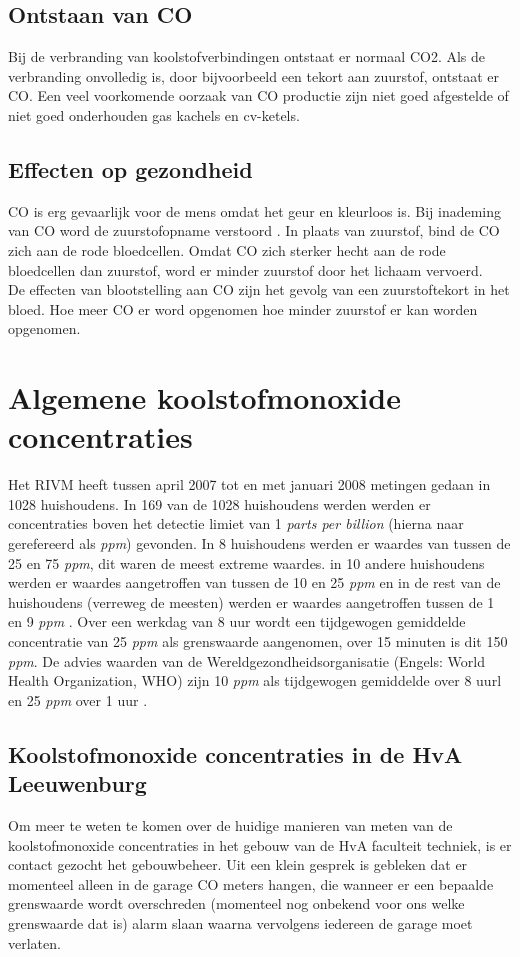 \documentclass[a4paper, 11pt]{article} %
\begin{document}
\subsection{Ontstaan van CO}
Bij de verbranding van koolstofverbindingen ontstaat er normaal CO2. Als de verbranding onvolledig is, door bijvoorbeeld een tekort aan zuurstof, ontstaat er CO. Een veel voorkomende oorzaak van CO productie zijn niet goed afgestelde of niet goed onderhouden gas kachels en cv-ketels.

\subsection{Effecten op gezondheid}
CO is erg gevaarlijk voor de mens omdat het geur en kleurloos is. Bij inademing van CO word de zuurstofopname verstoord \cite{Effecten Koolmonoxide}. In plaats van zuurstof, bind de CO zich aan de rode bloedcellen. Omdat CO zich sterker hecht aan de rode bloedcellen dan zuurstof, word er minder zuurstof door het lichaam vervoerd. 
\\
De effecten van blootstelling aan CO zijn het gevolg van een zuurstoftekort in het bloed. Hoe meer CO er word opgenomen hoe minder zuurstof er kan worden opgenomen. 

\section{Algemene koolstofmonoxide concentraties}
Het RIVM heeft tussen april 2007 tot en met januari 2008 metingen gedaan in 1028 huishoudens. In 169 van de 1028 huishoudens werden werden er concentraties boven het detectie limiet van 1 \textit{parts per billion} (hierna naar gerefereerd als \textit{ppm}) gevonden. In 8 huishoudens werden er waardes van tussen de 25 en 75 \textit{ppm}, dit waren de meest extreme waardes. in 10 andere huishoudens werden er waardes aangetroffen van tussen de 10 en 25 \textit{ppm} en in de rest van de huishoudens (verreweg de meesten) werden er waardes aangetroffen tussen de 1 en 9 \textit{ppm} \cite{RIVM huurwoningen}. Over een werkdag van 8 uur wordt een tijdgewogen gemiddelde concentratie van 25 \textit{ppm} als grenswaarde aangenomen, over 15 minuten is dit 150 \textit{ppm}. De advies waarden van de Wereldgezondheidsorganisatie (Engels: World Health Organization, WHO) zijn 10 \textit{ppm} als tijdgewogen gemiddelde over 8 uurl en 25 \textit{ppm} over 1 uur \cite{Blootstelling aan CO}.
\subsection{Koolstofmonoxide concentraties in de HvA Leeuwenburg}
Om meer te weten te komen over de huidige manieren van meten van de koolstofmonoxide concentraties in het gebouw van de HvA faculteit techniek, is er contact gezocht het gebouwbeheer. Uit een klein gesprek is gebleken dat er momenteel alleen in de garage CO meters hangen, die wanneer er een bepaalde grenswaarde wordt overschreden (momenteel nog onbekend voor ons welke grenswaarde dat is) alarm slaan waarna vervolgens iedereen de garage moet verlaten.
\end{document}
